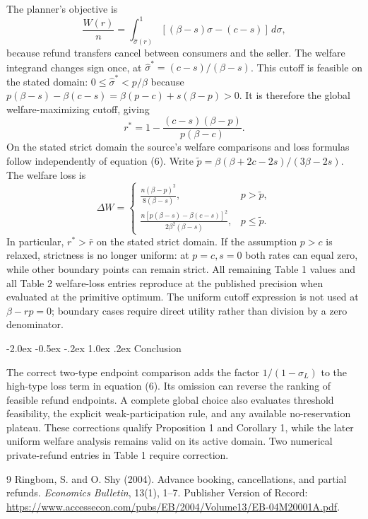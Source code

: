 \documentclass[12pt]{article}
\makeatletter
\renewcommand\section{\@startsection{section}{1}{\z@}%
  {-2.0ex \@plus -0.5ex \@minus -.2ex}%
  {1.0ex \@plus .2ex}%
  {\centering\normalfont\bfseries\fontsize{14}{16}\selectfont}}
\makeatother
\begin{document}
The planner's objective is
\[
 \frac{W(r)}n=\int_{\widehat\sigma(r)}^1[(\beta-s)\sigma-(c-s)]\,d\sigma,
\]
because refund transfers cancel between consumers and the seller. The welfare integrand changes sign once, at $\widehat\sigma^*=(c-s)/(\beta-s)$. This cutoff is feasible on the stated domain: $0\leq\widehat\sigma^*<p/\beta$ because $p(\beta-s)-\beta(c-s)=\beta(p-c)+s(\beta-p)>0$. It is therefore the global welfare-maximizing cutoff, giving
\[
 r^*=1-\frac{(c-s)(\beta-p)}{p(\beta-c)}.
\]
On the stated strict domain the source's welfare comparisons and loss formulas follow independently of equation (6). Write $\widetilde p=\beta(\beta+2c-2s)/(3\beta-2s)$. The welfare loss is
\[
 \Delta W=\begin{cases}
 \displaystyle\frac{n(\beta-p)^2}{8(\beta-s)},&p>\widetilde p,\\[6pt]
 \displaystyle\frac{n[p(\beta-s)-\beta(c-s)]^2}{2\beta^2(\beta-s)},&p\leq\widetilde p.
 \end{cases}
\]
In particular, $r^*>\bar r$ on the stated strict domain. If the assumption $p>c$ is relaxed, strictness is no longer uniform: at $p=c,s=0$ both rates can equal zero, while other boundary points can remain strict. All remaining Table 1 values and all Table 2 welfare-loss entries reproduce at the published precision when evaluated at the primitive optimum. The uniform cutoff expression is not used at $\beta-rp=0$; boundary cases require direct utility rather than division by a zero denominator.

\section{Conclusion}

The correct two-type endpoint comparison adds the factor $1/(1-\sigma_L)$ to the high-type loss term in equation (6). Its omission can reverse the ranking of feasible refund endpoints. A complete global choice also evaluates threshold feasibility, the explicit weak-participation rule, and any available no-reservation plateau. These corrections qualify Proposition 1 and Corollary 1, while the later uniform welfare analysis remains valid on its active domain. Two numerical private-refund entries in Table 1 require correction.

\begin{thebibliography}{9}
Ringbom, S. and O. Shy (2004).
\newblock Advance booking, cancellations, and partial refunds.
\newblock \emph{Economics Bulletin}, 13(1), 1--7.
\newblock Publisher Version of Record: \url{https://www.accessecon.com/pubs/EB/2004/Volume13/EB-04M20001A.pdf}.
\end{thebibliography}
\end{document}
